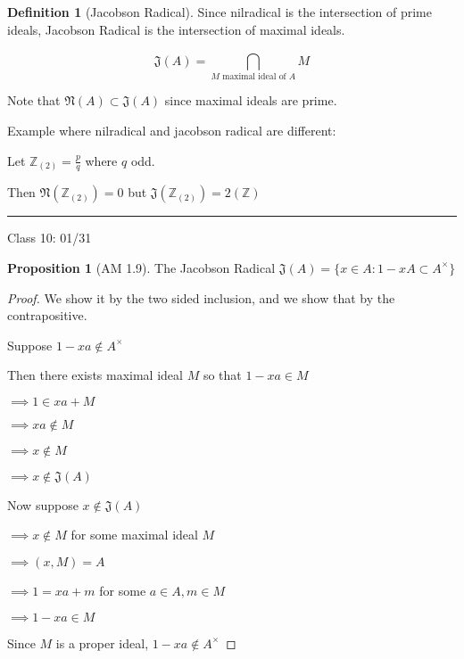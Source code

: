 \documentclass{article}
\theoremstyle{definition}
\newtheorem{definition}{Definition}
\newtheorem{proposition}{Proposition}
\begin{document}
\begin{definition}
    [Jacobson Radical]

    Since nilradical is the intersection of prime ideals, Jacobson Radical is the intersection of maximal ideals.

    \[
        \mathfrak{J}(A) = \bigcap_{M\text{ maximal ideal of }A}^{} M  
    \]

\end{definition}

Note that \(\mathfrak{N}(A) \subset \mathfrak{J}(A)  \)  since maximal ideals are prime.

Example where nilradical and jacobson radical are different:

Let \(\mathbb{Z} _{(2)} = \frac{p}{q}\) where \(q\) odd.

Then \(\mathfrak{N}(\mathbb{Z} _{(2)}) = 0\) but \(\mathfrak{J}(\mathbb{Z} _{(2)}) =2(\mathbb{Z})\) 

\hfil
\hrule

Class 10: 01/31

\begin{proposition}
    [AM 1.9] The Jacobson Radical \(\mathfrak{J} (A)=\{ x\in A : 1 - x A \subset A^\times \} \) 
\end{proposition}

\begin{proof}
    We show it by the two sided inclusion, and we show that by the contrapositive.

    Suppose \(1-xa \notin A^\times\) 

    Then there exists maximal ideal \(M\) so that \(1 - x a \in M\) 

    \(\implies 1\in xa + M\) 

    \(\implies xa \notin M\)
    
    \(\implies x\notin M\) 

    \(\implies x\notin \mathfrak{J} (A)\) 

    Now suppose \(x\notin \mathfrak{J} (A)\) 

    \(\implies x\notin M\) for some maximal ideal \(M\) 

    \(\implies (x,M) =A\)
    
    \(\implies 1 = xa+m\) for some \(a\in A,m\in M\) 

    \(\implies 1-xa\in M\)

    Since \(M\) is a proper ideal, \(1-xa\notin A^\times\)

\end{proof}
\end{document}
